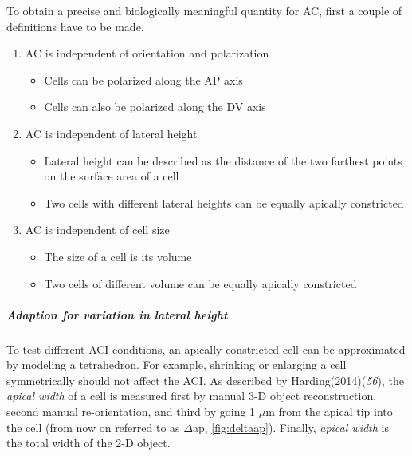 \documentclass[11pt,singlespacinge,twoside]{reedthesis} %
\providecommand{\tightlist}{%
  \setlength{\itemsep}{0pt}\setlength{\parskip}{0pt}}
\begin{document}
To obtain a precise and biologically meaningful quantity for AC, first a couple of definitions have to be made.
\begin{enumerate}
\def\labelenumi{\arabic{enumi}.}
\tightlist
\item
  AC is independent of orientation and polarization
  \begin{itemize}
  \tightlist
  \item
    Cells can be polarized along the AP axis
  \item
    Cells can also be polarized along the DV axis
  \end{itemize}
\item
  AC is independent of lateral height
  \begin{itemize}
  \tightlist
  \item
    Lateral height can be described as the distance of the two farthest points on the surface area of a cell
  \item
    Two cells with different lateral heights can be equally apically constricted
  \end{itemize}
\item
  AC is independent of cell size
  \begin{itemize}
  \tightlist
  \item
    The size of a cell is its volume
  \item
    Two cells of different volume can be equally apically constricted
  \end{itemize}
\end{enumerate}
\hypertarget{ACI-lat}{%
\subparagraph{Adaption for variation in lateral height}\label{ACI-lat}}

To test different ACI conditions, an apically constricted cell can be approximated by modeling a tetrahedron. For example, shrinking or enlarging a cell symmetrically should not affect the ACI. As described by Harding(2014)(\emph{56}), the \emph{apical width} of a cell is measured first by manual 3-D object reconstruction, second manual re-orientation, and third by going 1 \(\mu\)m from the apical tip into the cell (from now on referred to as \(\Delta\)ap, \ref{fig:deltaap}). Finally, \emph{apical width} is the total width of the 2-D object.
\end{document}
